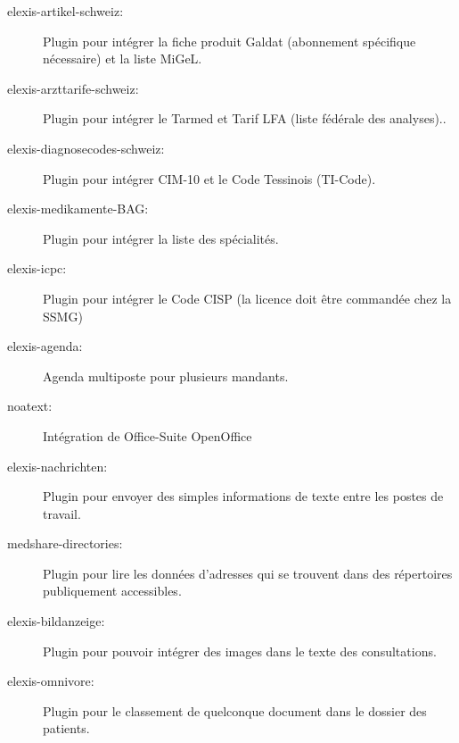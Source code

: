 \begin{description}
  \item [elexis-artikel-schweiz:] Plugin pour intégrer la fiche produit Galdat (abonnement spécifique nécessaire) et la liste MiGeL.
  \item[elexis-arzttarife-schweiz:] Plugin pour intégrer le Tarmed et Tarif LFA (liste fédérale des analyses)..

  \item[elexis-diagnosecodes-schweiz:] Plugin pour intégrer CIM-10 et le Code Tessinois (TI-Code).

  \item[elexis-medikamente-BAG:] Plugin pour intégrer la liste des spécialités.

  \item[elexis-icpc:] Plugin pour intégrer le Code CISP (la licence doit être commandée chez la SSMG)

  \item[elexis-agenda:] Agenda multiposte pour plusieurs mandants.

  \item[noatext:] Intégration de Office-Suite OpenOffice

  \item[elexis-nachrichten:] Plugin pour envoyer des simples informations de texte entre les postes de travail. 
  \item[medshare-directories:] Plugin pour lire les données d'adresses qui se trouvent dans des répertoires publiquement accessibles.
  \item[elexis-bildanzeige:] Plugin pour pouvoir intégrer des images dans le texte des consultations.
  \item[elexis-omnivore:] Plugin pour le classement de quelconque document dans le dossier des patients.


\end{description} 